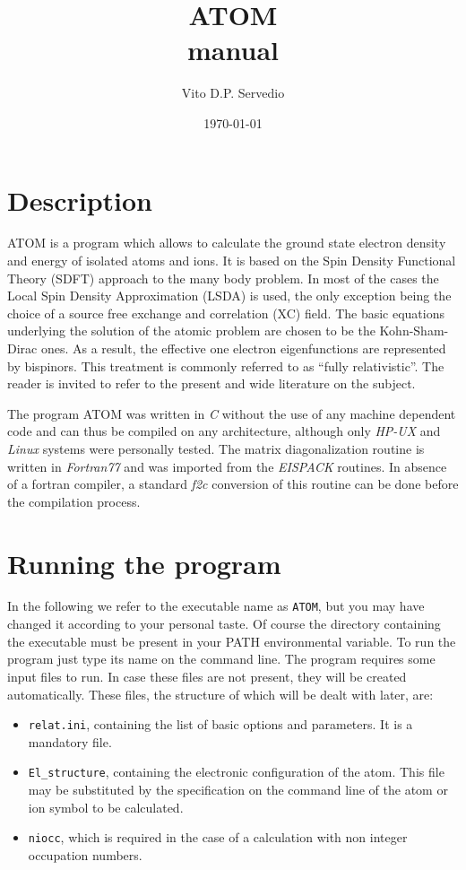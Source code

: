 
\renewcommand{\thesection}{\Alph{section}.}

\def\t{\texttt}
\def\e{\emph}
\def\mr{\mathrm}


\title{\Huge\bf ATOM\\manual}
\author{Vito D.P. Servedio}
\date{\today}
\maketitle

\section{Description}
ATOM is a program which allows to calculate the ground state electron
density and energy of isolated atoms and ions.
It is based on the Spin Density Functional Theory (SDFT) approach to the
many body problem. 
In most of the cases the Local Spin Density Approximation (LSDA) is
used, the only exception being the choice of a source free exchange
and correlation (XC) field.
The basic equations underlying the solution of the atomic problem are
chosen to be the Kohn-Sham-Dirac ones.
As a result, the effective one electron eigenfunctions are represented
by bispinors. 
This treatment is commonly referred to as ``fully relativistic''.
The reader is invited to refer to the present and wide literature on
the subject.

The program ATOM was written in \e{C} without the use of any machine
dependent code and can thus be compiled on any architecture, although
only \e{HP-UX} and \e{Linux} systems were personally tested.
The matrix diagonalization routine is written in \e{Fortran77} and was
imported from the \e{EISPACK} routines. 
In absence of a fortran compiler, a standard \e{f2c} conversion of
this routine can be done before the compilation process.

\section{Running the program}
In the following we refer to the executable name as \t{ATOM}, but
you may have changed it according to your personal taste.
Of course the directory containing the executable must be present in
your PATH environmental variable. 
To run the program just type its name on the command line.
The program requires some input files to run. 
In case these files are not present, they will be created
automatically.
These files, the structure of which will be dealt with later, are:
\begin{itemize}
\item \t{relat.ini}, containing the list of basic options and
parameters. It is a mandatory file.
\item \t{El\_structure}, containing the electronic configuration of
the atom. This file may be substituted by the specification on the
command line of the atom or ion symbol to be calculated.
\item \t{niocc}, which is required in the case of a calculation with
non integer occupation numbers.
\end{itemize}
